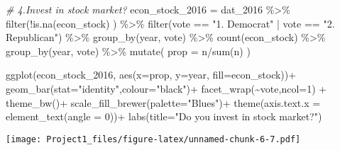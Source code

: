 \documentclass[
]{article}
\newenvironment{Shaded}{\begin{snugshade}}{\end{snugshade}}
\newcommand{\AttributeTok}[1]{\textcolor[rgb]{0.77,0.63,0.00}{#1}}
\newcommand{\CommentTok}[1]{\textcolor[rgb]{0.56,0.35,0.01}{\textit{#1}}}
\newcommand{\DecValTok}[1]{\textcolor[rgb]{0.00,0.00,0.81}{#1}}
\newcommand{\FunctionTok}[1]{\textcolor[rgb]{0.00,0.00,0.00}{#1}}
\newcommand{\NormalTok}[1]{#1}
\newcommand{\OtherTok}[1]{\textcolor[rgb]{0.56,0.35,0.01}{#1}}
\newcommand{\SpecialCharTok}[1]{\textcolor[rgb]{0.00,0.00,0.00}{#1}}
\newcommand{\StringTok}[1]{\textcolor[rgb]{0.31,0.60,0.02}{#1}}
\begin{document}
\begin{Shaded}
\begin{Highlighting}[]
\CommentTok{\# 4.Invest in stock market?}
\NormalTok{econ\_stock\_2016 }\OtherTok{=}\NormalTok{ dat\_2016 }\SpecialCharTok{\%\textgreater{}\%}
  \FunctionTok{filter}\NormalTok{(}\SpecialCharTok{!}\FunctionTok{is.na}\NormalTok{(econ\_stock) ) }\SpecialCharTok{\%\textgreater{}\%}
  \FunctionTok{filter}\NormalTok{(vote }\SpecialCharTok{==} \StringTok{"1. Democrat"} \SpecialCharTok{|}\NormalTok{ vote }\SpecialCharTok{==} \StringTok{"2. Republican"}\NormalTok{) }\SpecialCharTok{\%\textgreater{}\%}
  \FunctionTok{group\_by}\NormalTok{(year, vote) }\SpecialCharTok{\%\textgreater{}\%}
  \FunctionTok{count}\NormalTok{(econ\_stock) }\SpecialCharTok{\%\textgreater{}\%}
  \FunctionTok{group\_by}\NormalTok{(year, vote) }\SpecialCharTok{\%\textgreater{}\%}
  \FunctionTok{mutate}\NormalTok{(}
    \AttributeTok{prop =}\NormalTok{ n}\SpecialCharTok{/}\FunctionTok{sum}\NormalTok{(n)}
\NormalTok{  )}

\FunctionTok{ggplot}\NormalTok{(econ\_stock\_2016,}
       \FunctionTok{aes}\NormalTok{(}\AttributeTok{x=}\NormalTok{prop, }\AttributeTok{y=}\NormalTok{year, }\AttributeTok{fill=}\NormalTok{econ\_stock))}\SpecialCharTok{+}
  \FunctionTok{geom\_bar}\NormalTok{(}\AttributeTok{stat=}\StringTok{"identity"}\NormalTok{,}\AttributeTok{colour=}\StringTok{"black"}\NormalTok{)}\SpecialCharTok{+}
  \FunctionTok{facet\_wrap}\NormalTok{(}\SpecialCharTok{\textasciitilde{}}\NormalTok{vote,}\AttributeTok{ncol=}\DecValTok{1}\NormalTok{) }\SpecialCharTok{+}
  \FunctionTok{theme\_bw}\NormalTok{()}\SpecialCharTok{+}
  \FunctionTok{scale\_fill\_brewer}\NormalTok{(}\AttributeTok{palette=}\StringTok{"Blues"}\NormalTok{)}\SpecialCharTok{+}
  \FunctionTok{theme}\NormalTok{(}\AttributeTok{axis.text.x =} \FunctionTok{element\_text}\NormalTok{(}\AttributeTok{angle =} \DecValTok{0}\NormalTok{))}\SpecialCharTok{+}
  \FunctionTok{labs}\NormalTok{(}\AttributeTok{title=}\StringTok{"Do you invest in stock market?"}\NormalTok{)}
\end{Highlighting}
\end{Shaded}

\texttt{[image: Project1\_files/figure-latex/unnamed-chunk-6-7.pdf]}
\end{document}
